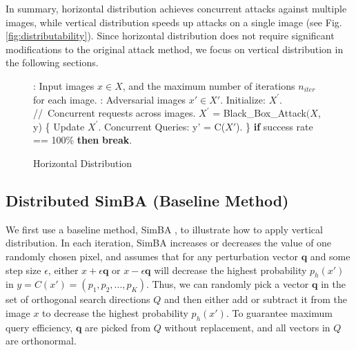 In summary, horizontal distribution achieves concurrent attacks against multiple images, while vertical distribution speeds up attacks on a single image (see Fig. \ref{fig:distributability}). Since horizontal distribution does not require significant modifications to the original attack method, we focus on vertical distribution in the following sections. 

\begin{figure}[H]
\begin{minipage}{\textwidth}
\begin{algorithm}[H]
    \centering
    \caption{Horizontal Distribution}
    \label{alg:horizontal}
    \begin{algorithmic}[1]
        : Input images $x \in X$, and the maximum number of iterations $n_{iter}$ for each image.
        : Adversarial images $x' \in X'$. 
        \State
        \State Initialize: $X^{'}$.
        \For {each iteration $n \in [0,\ n_{iter})$}
        \State //\ Concurrent requests across images.
            \State $X^{'}$ = Black\_Box\_Attack$(X$, y)
            \State \{
                \State \hspace{\algorithmicindent}Update $X^{'}$.
                \State \hspace{\algorithmicindent}Concurrent Queries: y{'} = C($X{'}$).
            \State \}
            \State \textbf{if} {success rate == 100\%} \textbf{then} {\textbf{break}}.
        \EndFor
    \end{algorithmic}
\end{algorithm}
\end{minipage}
\end{figure}

\subsection{Distributed SimBA (Baseline Method)}

We first use a baseline method, SimBA \citep{guo2019simple}, to illustrate how to apply vertical distribution. In each iteration, SimBA increases or decreases the value of one randomly chosen pixel, and assumes that for any perturbation vector $\boldsymbol{q}$ and some step size $\epsilon$, either $x + \epsilon\boldsymbol{q}$ or $x - \epsilon\boldsymbol{q}$ will decrease the highest probability $p_h(x')$ in $y = C(x')= (p_1, p_2, ..., p_K)$. Thus, we can randomly pick a vector $\boldsymbol{q}$ in the set of orthogonal search directions $Q$ and then either add or subtract it from the image $x$ to decrease the highest probability $p_h(x')$. To guarantee maximum query efficiency, $\boldsymbol{q}$ are picked from $Q$ without replacement, and all vectors in $Q$ are orthonormal.

